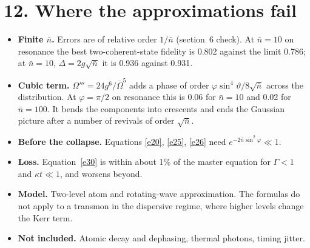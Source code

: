 \documentclass[11pt,letterpaper]{article}
\newcommand{\nbar}{\bar{n}}
\newcommand{\Obar}{\bar{\Omega}}
\begin{document}
\section*{12. Where the approximations fail}
\begin{itemize}[nosep,leftmargin=1.5em]
\item \textbf{Finite $\nbar$.} Errors are of relative order $1/\nbar$ (section~6 check). At $\nbar=10$ on
      resonance the best two-coherent-state fidelity is 0.802 against the limit 0.786; at $\nbar=10$,
      $\Delta=2g\sqrt{\nbar}$ it is 0.936 against 0.931.
\item \textbf{Cubic term.} $\Omega'''=24g^6/\Obar^5$ adds a phase of order
      $\varphi\sin^4\vartheta/8\sqrt{\nbar}$ across the distribution. At $\varphi=\pi/2$ on resonance
      this is 0.06 for $\nbar=10$ and 0.02 for $\nbar=100$. It bends the components into crescents and
      ends the Gaussian picture after a number of revivals of order $\sqrt{\nbar}$.
\item \textbf{Before the collapse.} Equations \eqref{e20}, \eqref{e25}, \eqref{e26} need $e^{-2\nbar\sin^2\varphi}\ll1$.
\item \textbf{Loss.} Equation~\eqref{e30} is within about 1\% of the master equation for $\Gamma<1$ and
      $\kappa t\ll1$, and worsens beyond.
\item \textbf{Model.} Two-level atom and rotating-wave approximation. The formulas do not apply to a
      transmon in the dispersive regime, where higher levels change the Kerr term.
\item \textbf{Not included.} Atomic decay and dephasing, thermal photons, timing jitter.
\end{itemize}
\end{document}

